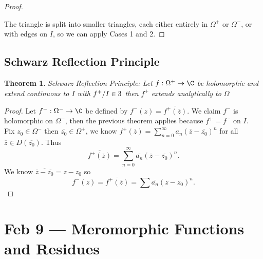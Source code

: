 \documentclass[a4paper]{article}
\newtheorem{thm}{Theorem}[section]
\begin{document}
\begin{proof}
\begin{center}
    \end{center}
    The triangle is split into smaller triangles, each either entirely in $\Omega^+$ or $\Omega^-$, or with edges on $I$, so we can apply Cases 1 and 2.
\end{proof}
\subsection{Schwarz Reflection Principle}
\begin{thm}
    Schwarz Reflection Principle: Let $f:\Omega^+\to \C$ be holomorphic and extend continuous to $I$ with $f^+/I\in 3$ then $f^+$ extends analytically to $\Omega$
\end{thm}
\begin{proof}
    Let $f^-:\Omega^-\to \C$ be defined by $f^-(z)=\overline{f^+(\overline{z})}$. We claim $f^-$ is holomorphic on $\Omega^-$, then the previous theorem applies because $f^+=f^-$ on $I.$\\
    Fix $z_0\in \Omega^-$ then $\overline{z_0}\in \Omega^+$, we know $f^+(\overline{z})=\sum_{n=0}^{\infty}a_n(\overline{z}-\overline{z_0})^n$ for all $\overline{z}\in D(\overline{z_0})$. Thus \[
    \overline{f^+(\overline{z})}=\sum_{n=0}^\infty \overline{a_n}(\overline{z}-\overline{z_0})^n
    .\] 
    We know $\overline{\overline{z}-\overline{z_0}}=z-z_0$ so \[
    f^-(z)=\overline{f^+(\overline{z})}=\sum\overline{a_n}(z-z_0)^n
    .\] 
\end{proof}
\newpage
\section{Feb 9 --- Meromorphic Functions and Residues}
\end{document}
